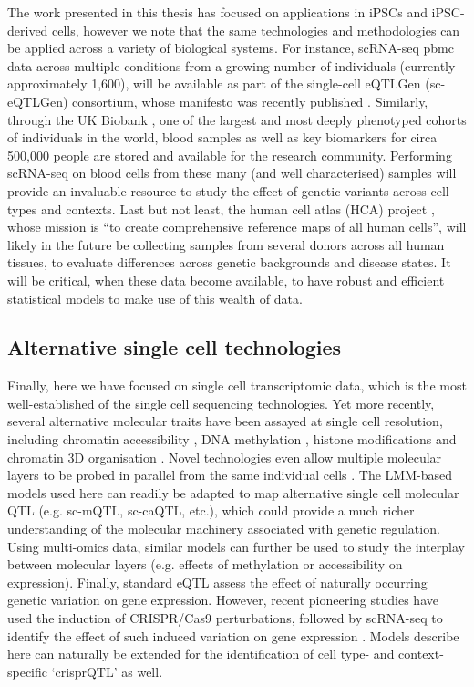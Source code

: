 The work presented in this thesis has focused on applications in iPSCs and iPSC-derived cells, however we note that the same technologies and methodologies can be applied across a variety of biological systems.
For instance, scRNA-seq \gls{pbmc} data across multiple conditions from a growing number of individuals (currently approximately 1,600), will be available as part of the single-cell eQTLGen (sc-eQTLGen) consortium, whose manifesto was recently published \cite{van2020single1}.
Similarly, through the UK Biobank \cite{bycroft2018uk}, one of the largest and most deeply phenotyped cohorts of individuals in the world, blood samples as well as key biomarkers for circa 500,000 people are stored and available for the research community.
Performing scRNA-seq on blood cells from these many (and well characterised) samples will provide an invaluable resource to study the effect of genetic variants across cell types and contexts.
Last but not least, the human cell atlas (HCA) project \cite{regev2017science}, whose mission is “to create comprehensive reference maps of all human cells”, will likely in the future be collecting samples from several donors across all human tissues, to evaluate differences across genetic backgrounds and disease states.
It will be critical, when these data become available, to have robust and efficient statistical models to make use of this wealth of data.

\subsection{Alternative single cell technologies}

Finally, here we have focused on single cell transcriptomic data, which is the most well-established of the single cell sequencing technologies.
Yet more recently, several alternative molecular traits have been assayed at single cell resolution, including chromatin accessibility  \cite{buenrostro2018integrated, corces2016lineage}, DNA methylation  \cite{guo2013single, smallwood2014single, farlik2015single}, histone modifications \cite{rotem2015single} and chromatin 3D organisation \cite{nagano2013single}.
Novel technologies even allow multiple molecular layers to be probed in parallel from the same individual cells \cite{stoeckius2017simultaneous, cao2018joint, clark2018scnmt}.
The LMM-based models used here can readily be adapted to map alternative single cell molecular QTL (e.g. sc-mQTL, sc-caQTL, etc.), which could provide a much richer understanding of the molecular machinery associated with genetic regulation.
Using multi-omics data, similar models can further be used to study the interplay between molecular layers (e.g. effects of methylation or accessibility on expression).
Finally, standard eQTL assess the effect of naturally occurring genetic variation on gene expression.
However, recent pioneering studies have used the induction of CRISPR/Cas9 perturbations, followed by scRNA-seq to identify the effect of such induced variation on gene expression \cite{gasperini2019genome}.
Models describe here can naturally be extended for the identification of cell type- and context-specific `crisprQTL' as well.

